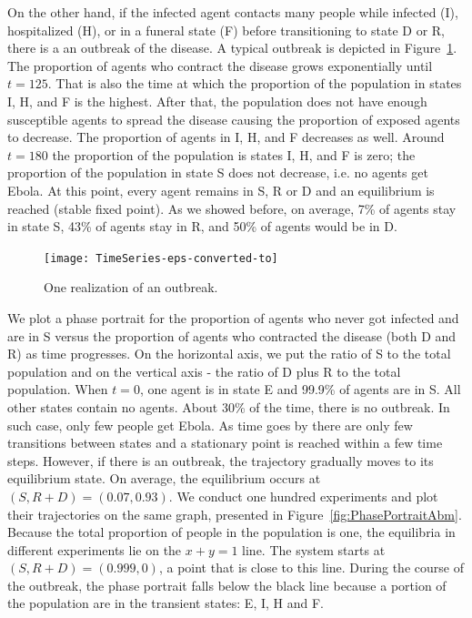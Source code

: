 On the other hand, if the infected agent contacts many people while infected (I), hospitalized (H), or in a funeral state (F) before transitioning to state D or R, there is a an outbreak of the disease. A typical outbreak is depicted in Figure~\ref{fig:Outbreak}. The proportion of agents who contract the disease grows exponentially until $t = 125$. That is also the time at which the proportion of the population in states I, H, and F is the highest. After that, the population does not have enough susceptible agents to spread the disease causing the proportion of exposed agents to decrease. The proportion of agents in I, H, and F decreases as well. Around $t = 180$ the proportion of the population is states I, H, and F is zero; the proportion of the population in state S does not decrease, i.e. no agents get Ebola. At this point, every agent remains in S, R or D and an equilibrium is reached (stable fixed point). As we showed before, on average, 7\% of agents stay in state S, 43\% of agents stay in R, and 50\% of agents would be in D. %
\begin{figure}[h!]
\begin{center}
\texttt{[image: TimeSeries-eps-converted-to]}
\end{center}
\caption{One realization of an outbreak.}
\label{fig:Outbreak}
\end{figure}


We plot a phase portrait for the proportion of agents who never got infected and are in S versus the proportion of agents who contracted the disease (both D and R) as time progresses. On the horizontal axis, we put the ratio of S to the total population and on the vertical axis - the ratio of D plus R to the total population.  When $t = 0$, one agent is in state E and 99.9\% of agents are in S. All other states contain no agents. About 30\% of the time, there is no outbreak. In such case, only few people get Ebola. As time goes by there are only few transitions between states and a stationary point is reached within a few time steps. However, if there is an outbreak, the trajectory gradually moves to its equilibrium state. On average, the equilibrium occurs at $(S, R+ D) = (0.07, 0.93)$. We conduct one hundred experiments and plot their trajectories on the same graph, presented in Figure~\ref{fig:PhasePortraitAbm}. Because the total proportion of people in the population is one, the equilibria in different experiments lie on the $x + y = 1$ line. The system starts at $(S, R+D) = (0.999, 0)$, a point that is close to this line. During the course of the outbreak, the phase portrait falls below the black line because a portion of the population are in the transient states: E, I, H and F. 

